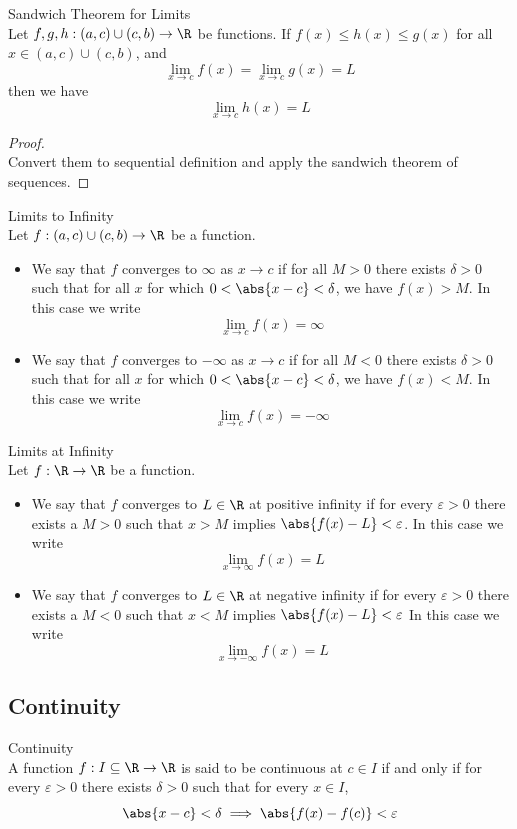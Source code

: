 \documentclass[a4paper]{article}
\begin{document}
\begin{thm}{Sandwich Theorem for Limits}{}\\ Let $f,g,h:(a,c)\cup(c,b)\to\R$ be functions. If $f(x)\leq h(x)\leq g(x)$ for all $x\in (a,c)\cup(c,b)$, and $$\lim_{x\to c}f(x)=\lim_{x\to c}g(x)=L$$ then we have $$\lim_{x\to c}h(x)=L$$ 
\begin{proof}\\ Convert them to sequential definition and apply the sandwich theorem of sequences. 
\end{proof}
\end{thm}

\begin{defn}{Limits to Infinity}{}\\ Let $f:(a,c)\cup(c,b)\to\R$ be a function. 
\begin{itemize} 
\item We say that $f$ converges to $\infty$ as $x\to c$ if for all $M>0$ there exists $\delta>0$ such that for all $x$ for which $0<\abs{x-c}<\delta$, we have $f(x)>M$. In this case we write $$\lim_{x\to c}f(x)=\infty$$
\item We say that $f$ converges to $-\infty$ as $x\to c$ if for all $M<0$ there exists $\delta>0$ such that for all $x$ for which $0<\abs{x-c}<\delta$, we have $f(x)<M$. In this case we write $$\lim_{x\to c}f(x)=-\infty$$
\end{itemize}
\end{defn}

\begin{defn}{Limits at Infinity}{}\\ Let $f:\R\to\R$ be a function. 
\begin{itemize} 
\item We say that $f$ converges to $L\in\R$ at positive infinity if for every $\varepsilon>0$ there exists a $M>0$ such that $x>M$ implies $\abs{f(x)-L}<\varepsilon$. In this case we write $$\lim_{x\to\infty}f(x)=L$$
\item We say that $f$ converges to $L\in\R$ at negative infinity if for every $\varepsilon>0$ there exists a $M<0$ such that $x<M$ implies $\abs{f(x)-L}<\varepsilon$ In this case we write $$\lim_{x\to-\infty}f(x)=L$$
\end{itemize}
\end{defn}

\subsection{Continuity}
\begin{defn}{Continuity}{}\\ A function $f:I\subseteq\R\to\R$ is said to be continuous at $c\in I$ if and only if for every $\varepsilon>0$ there exists $\delta>0$ such that for every $x\in I$, $$\abs{x-c}<\delta\implies\abs{f(x)-f(c)}<\varepsilon$$
\end{defn}
\end{document}
